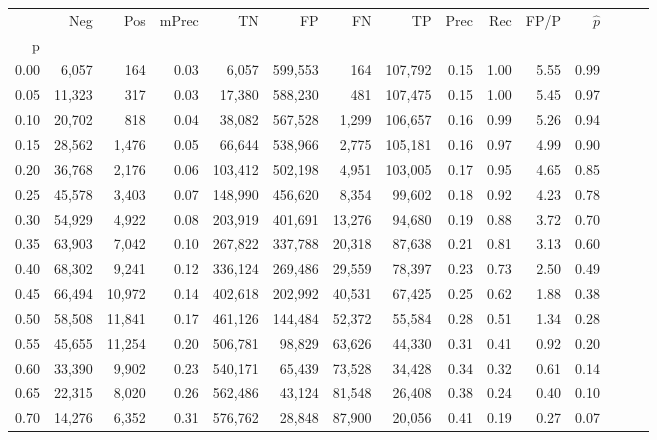 \begin{tabular}{rrrrrrrrrrrrrrr}
\toprule
{} &     Neg &     Pos & mPrec &       TN &       FP &       FN &       TP &  Prec &   Rec &  FP/P & $\hat{p}$ \\
p    &         &         &       &          &          &          &          &       &       &       &           \\
\midrule
0.00 &   6,057 &     164 &  0.03 &    6,057 &  599,553 &      164 &  107,792 &  0.15 &  1.00 &  5.55 &      0.99 \\
0.05 &  11,323 &     317 &  0.03 &   17,380 &  588,230 &      481 &  107,475 &  0.15 &  1.00 &  5.45 &      0.97 \\
0.10 &  20,702 &     818 &  0.04 &   38,082 &  567,528 &    1,299 &  106,657 &  0.16 &  0.99 &  5.26 &      0.94 \\
0.15 &  28,562 &   1,476 &  0.05 &   66,644 &  538,966 &    2,775 &  105,181 &  0.16 &  0.97 &  4.99 &      0.90 \\
0.20 &  36,768 &   2,176 &  0.06 &  103,412 &  502,198 &    4,951 &  103,005 &  0.17 &  0.95 &  4.65 &      0.85 \\
0.25 &  45,578 &   3,403 &  0.07 &  148,990 &  456,620 &    8,354 &   99,602 &  0.18 &  0.92 &  4.23 &      0.78 \\
0.30 &  54,929 &   4,922 &  0.08 &  203,919 &  401,691 &   13,276 &   94,680 &  0.19 &  0.88 &  3.72 &      0.70 \\
0.35 &  63,903 &   7,042 &  0.10 &  267,822 &  337,788 &   20,318 &   87,638 &  0.21 &  0.81 &  3.13 &      0.60 \\
0.40 &  68,302 &   9,241 &  0.12 &  336,124 &  269,486 &   29,559 &   78,397 &  0.23 &  0.73 &  2.50 &      0.49 \\
0.45 &  66,494 &  10,972 &  0.14 &  402,618 &  202,992 &   40,531 &   67,425 &  0.25 &  0.62 &  1.88 &      0.38 \\
0.50 &  58,508 &  11,841 &  0.17 &  461,126 &  144,484 &   52,372 &   55,584 &  0.28 &  0.51 &  1.34 &      0.28 \\
0.55 &  45,655 &  11,254 &  0.20 &  506,781 &   98,829 &   63,626 &   44,330 &  0.31 &  0.41 &  0.92 &      0.20 \\
0.60 &  33,390 &   9,902 &  0.23 &  540,171 &   65,439 &   73,528 &   34,428 &  0.34 &  0.32 &  0.61 &      0.14 \\
0.65 &  22,315 &   8,020 &  0.26 &  562,486 &   43,124 &   81,548 &   26,408 &  0.38 &  0.24 &  0.40 &      0.10 \\
0.70 &  14,276 &   6,352 &  0.31 &  576,762 &   28,848 &   87,900 &   20,056 &  0.41 &  0.19 &  0.27 &      0.07 \\

\end{tabular}
